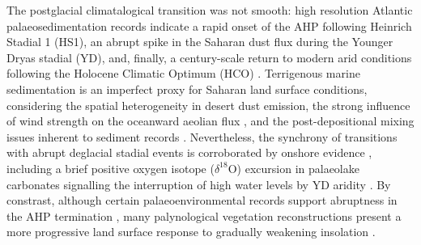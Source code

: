 \documentclass[a4paper]{article}
\newcommand{\delO}{\ensuremath{\delta ^{18}}O}
\begin{document}
The postglacial climatalogical transition was not smooth: high resolution Atlantic palaeosedimentation records indicate a rapid onset of the AHP following Heinrich Stadial 1 (HS1), an abrupt spike in the Saharan dust flux during the Younger Dryas stadial (YD), and, finally, a century-scale return to modern arid conditions following the Holocene Climatic Optimum (HCO) \parencite{demenocal2000abrupt, kuhlmann2004transition, adkins2006african, mcgee2013magnitude, ehrmann2013dynamics, williams2016glacial}.
Terrigenous marine sedimentation is an imperfect proxy for Saharan land surface conditions, considering the spatial heterogeneity in desert dust emission, the strong influence of wind strength on the oceanward aeolian flux \parencite{ruddiman1997tropical, mcgee2010gustiness, parker2016new}, and the post-depositional mixing issues inherent to sediment records \parencite{mahowald1999dust, giresse2003late, maslin2003evidence}.
Nevertheless, the synchrony of transitions with abrupt deglacial stadial events is corroborated by onshore evidence \parencite{gasse1994abrupt, garcin2007abrupt, talbot2007abrupt}, including a brief positive oxygen isotope (\delO) excursion in palaeolake carbonates signalling the interruption of high water levels by YD aridity \parencite{gasse1990arid}.
By constrast, although certain palaeoenvironmental records support abruptness in the AHP termination \parencite{gasse1990arid, salzmann2005dahomey, tierney2013abrupt, tierney2017rainfall}, many palynological vegetation reconstructions present a more progressive land surface response to gradually weakening insolation \parencite{kropelin2008climate, lezine2009timing, vincens2010vegetation, amaral2013palynological, shanahan2015time}. 


\end{document}

